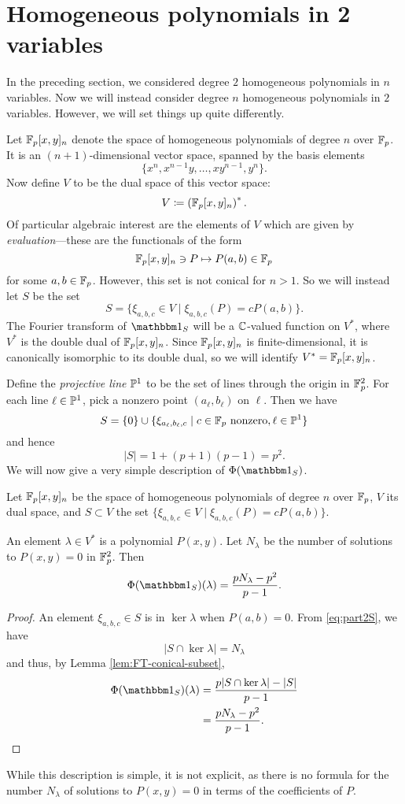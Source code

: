 \section{Homogeneous polynomials in 2 variables}\label{sec:part2}
In the preceding section, we considered degree $2$ homogeneous polynomials in $n$ variables. Now we will instead consider degree $n$ homogeneous polynomials in $2$ variables. However, we will set things up quite differently.

Let $\F_p[x,y]_n$ denote the space of homogeneous polynomials of degree $n$ over $\F_p$. It is an $(n+1)$-dimensional vector space, spanned by the basis elements
\[
	\{x^n, x^{n-1}y, \ldots, xy^{n-1}, y^n\}.
\]
Now define $V$ to be the dual space of this vector space:
\[
	V \coloneqq \left(\F_p[x,y]_n\right)^*.
\]
Of particular algebraic interest are the elements of $V$ which are given by \emph{evaluation}---these are the functionals of the form
\[
	\F_p[x,y]_n \ni P \mapsto P(a,b) \in \F_p
\]
for some $a,b\in \F_p$. However, this set is not conical for $n>1$. So we will instead let $S$ be the set
\[
	S=\{\xi_{a,b,c} \in V \mid \xi_{a,b,c}(P) = cP(a,b)\}.
\]
The Fourier transform of $\IND_S$ will be a $\C$-valued function on $V^*$, where $V^*$ is the double dual of $\F_p[x,y]_n$. Since $\F_p[x,y]_n$ is finite-dimensional, it is canonically isomorphic to its double dual, so we will identify $V^* = \F_p[x,y]_n$.

Define the \emph{projective line} $\P^1$ to be the set of lines through the origin in $\F_p^2$. For each line $\ell \in \P^1$, pick a nonzero point $(a_\ell,b_\ell)$ on $\ell$. Then we have
\begin{equation}\label{eq:part2S}
	S = \{0\} \cup \{\xi_{a_\ell,b_\ell,c} \mid c\in \F_p \text{ nonzero}, \ell \in \P^1 \}
\end{equation}
and hence
\[
	|S| = 1 + (p+1)(p-1) = p^2.
\]
We will now give a very simple description of $\Phi(\IND_S)$.
\begin{thm}\label{thm:part2thm}
	Let $\F_p[x,y]_n$ be the space of homogeneous polynomials of degree $n$ over $\F_p$, $V$ its dual space, and $S\subset V$ the set $\{\xi_{a,b,c} \in V \mid \xi_{a,b,c}(P) = cP(a,b)\}$.
	
	An element $\lambda \in V^*$ is a polynomial $P(x,y)$. Let $N_\lambda$ be the number of solutions to $P(x,y)=0$ in $\F_p^2$. Then
	\[
		\Phi(\IND_S)(\lambda) = \frac{pN_\lambda - p^2}{p-1}.
	\]
\end{thm}
\begin{proof}
	An element $\xi_{a,b,c}\in S$ is in $\ker \lambda$ when $P(a,b) = 0$. From \eqref{eq:part2S}, we have
	\[
		|S \cap \ker \lambda| = N_\lambda
	\]
	and thus, by Lemma \ref{lem:FT-conical-subset},
	\begin{align*}
		\Phi (\IND_S) (\lambda) &= \frac{p|S\cap \ker \lambda| - |S|}{p-1}\\
		&= \frac{pN_\lambda - p^2}{p-1}.\qedhere
	\end{align*}
\end{proof}
While this description is simple, it is not explicit, as there is no formula for the number $N_\lambda$ of solutions to $P(x,y) = 0$ in terms of the coefficients of $P$.

